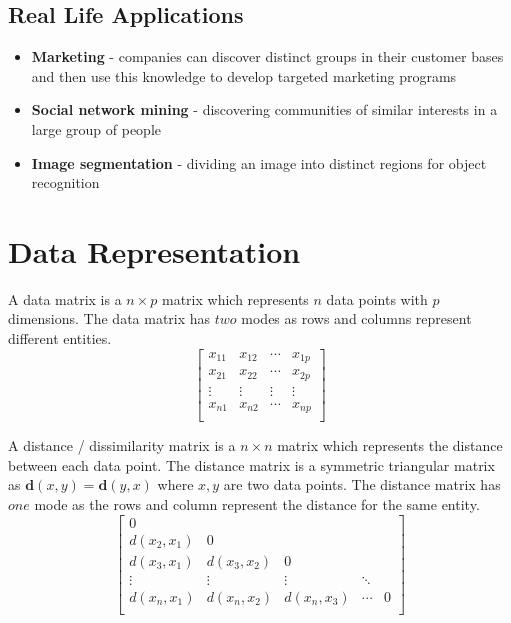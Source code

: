\documentclass[11pt,fleqn]{book} %
\begin{document}
\subsection*{Real Life Applications}
\begin{itemize}
	\item \textbf{Marketing} - companies can discover distinct groups in their customer bases and then use this knowledge to develop targeted marketing programs
	\item \textbf{Social network mining} - discovering communities of similar interests in a large group of people
	\item \textbf{Image segmentation} - dividing an image into distinct regions for object recognition
\end{itemize}

\section{Data Representation}
\begin{multicols}{2}
\noindent
A data matrix is a $n \times p$ matrix which represents $n$ data points with $p$ dimensions. The data matrix has $two$ modes as rows and columns represent different entities.
\columnbreak
\begin{equation*}
	\begin{bmatrix}
		x_{11} & x_{12} & \cdots & x_{1p} \\
		x_{21} & x_{22} & \cdots & x_{2p} \\
		\vdots & \vdots & \vdots & \vdots \\
		x_{n1} & x_{n2} & \cdots & x_{np} \\
	\end{bmatrix}
\end{equation*}
\end{multicols}

\begin{multicols}{2}
\noindent
A distance / dissimilarity matrix is a $n \times n$ matrix which represents the distance between each data point. The distance matrix is a symmetric triangular matrix as $\mathbf{d}(x, y) = \mathbf{d}(y, x)$ where $x, y$ are two data points. The distance matrix has $one$ mode as the rows and column represent the distance for the same entity.
\columnbreak
\begin{equation*}
	\begin{bmatrix}
		0 & & & & \\
		d(x_2, x_1) & 0 & & & \\
		d(x_3, x_1) & d(x_3, x_2) & 0 & & \\
		\vdots & \vdots & \vdots & \ddots & \\
		d(x_n, x_1) & d(x_n, x_2) & d(x_n, x_3) & \cdots & 0\\
	\end{bmatrix}
\end{equation*}
\end{multicols}
\end{document}
